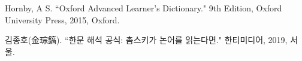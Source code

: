 \par Hornby, A S. ``Oxford Advanced Learner's Dictionary." 9th Edition, Oxford University Press, 2015, Oxford.
\par 김종호(金琮鎬). ``한문 해석 공식: 촘스키가 논어를 읽는다면." 한티미디어, 2019, 서울.
